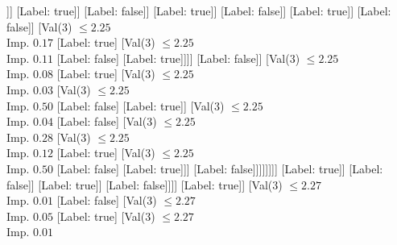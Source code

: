 \documentclass[margin=10pt]{standalone}
\begin{document}
\begin{forest}
																													[Val($3$) $ \leq 2.24$ \\ Imp. $0.25$
																														[Val($3$) $ \leq 2.24$ \\ Imp. $0.03$
																															[Label: false]
																															[Val($3$) $ \leq 2.24$ \\ Imp. $0.38$
																																[Label: true]
																																[Label: false]]]
																														[Label: true]]
																													[Label: false]]
																												[Label: true]]
																											[Label: false]]
																										[Label: true]]
																									[Label: false]]
																								[Val($3$) $ \leq 2.25$ \\ Imp. $0.17$
																									[Label: true]
																									[Val($3$) $ \leq 2.25$ \\ Imp. $0.11$
																										[Label: false]
																										[Label: true]]]]
																							[Label: false]]
																						[Val($3$) $ \leq 2.25$ \\ Imp. $0.08$
																							[Label: true]
																							[Val($3$) $ \leq 2.25$ \\ Imp. $0.03$
																								[Val($3$) $ \leq 2.25$ \\ Imp. $0.50$
																									[Label: false]
																									[Label: true]]
																								[Val($3$) $ \leq 2.25$ \\ Imp. $0.04$
																									[Label: false]
																									[Val($3$) $ \leq 2.25$ \\ Imp. $0.28$
																										[Val($3$) $ \leq 2.25$ \\ Imp. $0.12$
																											[Label: true]
																											[Val($3$) $ \leq 2.25$ \\ Imp. $0.50$
																												[Label: false]
																												[Label: true]]]
																										[Label: false]]]]]]]]
																			[Label: true]]
																		[Label: false]]
																	[Label: true]]
																[Label: false]]]]
													[Label: true]]
												[Val($3$) $ \leq 2.27$ \\ Imp. $0.01$
													[Label: false]
													[Val($3$) $ \leq 2.27$ \\ Imp. $0.05$
														[Label: true]
														[Val($3$) $ \leq 2.27$ \\ Imp. $0.01$

\end{forest}
\end{document}
